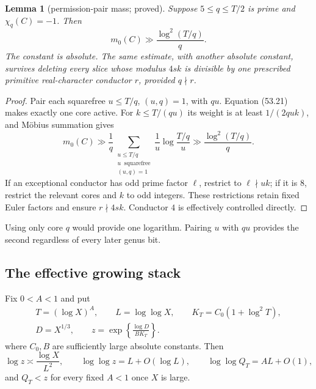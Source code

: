 \documentclass[10pt,reqno]{amsart}
\newtheorem{lemma}[theorem]{Lemma}
\theoremstyle{definition}
\newcommand{\1}{\mathbf 1}
\begin{document}
\begin{lemma}[permission-pair mass; proved]\label{lem:permission-mass}
Suppose $5\leq q\leq T/2$ is prime and $\chi_q(C)=-1$.  Then
\begin{equation}\tag{53.22}
                         m_0(C)\gg\frac{\log^2(T/q)}q.
\end{equation}
The constant is absolute.  The same estimate, with another absolute
constant, survives deleting every slice whose modulus $4sk$ is divisible
by one prescribed primitive real-character conductor $r$, provided
$q\nmid r$.
\end{lemma}
\begin{proof}
Pair each squarefree $u\leq T/q$, $(u,q)=1$, with $qu$.  Equation (53.21)
makes exactly one core active.  For $k\leq T/(qu)$ its weight is at least $1/(2quk)$, and M\"obius
summation gives
\begin{equation}\tag{53.24}
 m_0(C)\gg\frac1q
 \sum_{\substack{u\leq T/q\\u\ \text{ squarefree}\\(u,q)=1}}
 \frac1u\log\frac{T/q}{u}\gg\frac{\log^2(T/q)}q.
\end{equation}
If an exceptional conductor has odd prime factor $\ell$, restrict to
$\ell\nmid uk$; if it is $8$, restrict the relevant cores and $k$ to odd
integers.  These restrictions retain fixed Euler factors and ensure
$r\nmid4sk$.  Conductor $4$ is effectively controlled directly.
\end{proof}
Using only core $q$ would provide one logarithm.  Pairing $u$ with $qu$
provides the second regardless of every later genus bit.

\subsection{The effective growing stack}
Fix $0<A<1$ and put
\begin{equation}\tag{53.25}
 \begin{gathered}
 T=(\log X)^A,\qquad L=\log\log X,\qquad
 K_T=C_0(1+\log^2T),\\
 D=X^{1/3},\qquad z=\exp\left\{\frac{\log D}{BK_T}\right\}.
 \end{gathered}
\end{equation}
where $C_0,B$ are sufficiently large absolute constants.  Then
\begin{equation}\tag{53.26}
 \log z\asymp\frac{\log X}{L^2},\qquad
 \log\log z=L+O(\log L),\qquad
 \log\log Q_T=AL+O(1),
\end{equation}
and $Q_T<z$ for every fixed $A<1$ once $X$ is large.
\end{document}
